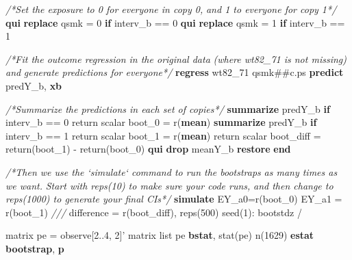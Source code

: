 \documentclass[
  10pt,
]{book}
\newenvironment{Shaded}{\begin{snugshade}}{\end{snugshade}}
\newcommand{\CommentTok}[1]{\textcolor[rgb]{0.56,0.35,0.01}{\textit{#1}}}
\newcommand{\DecValTok}[1]{\textcolor[rgb]{0.00,0.00,0.81}{#1}}
\newcommand{\FunctionTok}[1]{\textcolor[rgb]{0.00,0.00,0.00}{#1}}
\newcommand{\KeywordTok}[1]{\textcolor[rgb]{0.13,0.29,0.53}{\textbf{#1}}}
\newcommand{\NormalTok}[1]{#1}
\newcommand{\OtherTok}[1]{\textcolor[rgb]{0.56,0.35,0.01}{#1}}
\begin{document}
\begin{Shaded}
\begin{Highlighting}[]
\CommentTok{/*Set the exposure to 0 for everyone in copy 0, }
\CommentTok{and 1 to everyone for copy 1*/}
\KeywordTok{qui} \KeywordTok{replace}\NormalTok{ qsmk = 0 }\KeywordTok{if}\NormalTok{ interv_b == 0}
\KeywordTok{qui} \KeywordTok{replace}\NormalTok{ qsmk = 1 }\KeywordTok{if}\NormalTok{ interv_b == 1}

\CommentTok{/*Fit the outcome regression in the original data }
\CommentTok{(where wt82_71 is not missing) and }
\CommentTok{generate predictions for everyone*/}
\KeywordTok{regress}\NormalTok{ wt82_71 qsmk##c.ps}
\KeywordTok{predict}\NormalTok{ predY_b, }\KeywordTok{xb}

\CommentTok{/*Summarize the predictions in each set of copies*/}
\KeywordTok{summarize}\NormalTok{ predY_b }\KeywordTok{if}\NormalTok{ interv_b == 0}
\FunctionTok{return} \FunctionTok{scalar}\NormalTok{ boot_0 = }\FunctionTok{r}\NormalTok{(}\KeywordTok{mean}\NormalTok{)}
\KeywordTok{summarize}\NormalTok{ predY_b }\KeywordTok{if}\NormalTok{ interv_b == 1}
\FunctionTok{return} \FunctionTok{scalar}\NormalTok{ boot_1 = }\FunctionTok{r}\NormalTok{(}\KeywordTok{mean}\NormalTok{)}
\FunctionTok{return} \FunctionTok{scalar}\NormalTok{ boot_diff = }\FunctionTok{return}\NormalTok{(boot_1) - }\FunctionTok{return}\NormalTok{(boot_0)}
\KeywordTok{qui} \KeywordTok{drop}\NormalTok{ meanY_b}
\KeywordTok{restore}
\KeywordTok{end}

\CommentTok{/*Then we use the `simulate` command to run the bootstraps }
\CommentTok{as many times as we want.}
\CommentTok{Start with reps(10) to make sure your code runs, }
\CommentTok{and then change to reps(1000) to generate your final CIs*/}
\KeywordTok{simulate}\NormalTok{ EY_a0=}\FunctionTok{r}\NormalTok{(boot_0) EY_a1 = }\FunctionTok{r}\NormalTok{(boot_1) }\CommentTok{///}
\NormalTok{  difference = }\FunctionTok{r}\NormalTok{(boot_diff), reps(500) }\DecValTok{seed}\NormalTok{(1): bootstdz /}

\FunctionTok{matrix}\NormalTok{ pe = observe[2..4, 2]'}
\FunctionTok{matrix} \OtherTok{list}\NormalTok{ pe}
\KeywordTok{bstat}\NormalTok{, stat(pe) n(1629) }
\KeywordTok{estat} \KeywordTok{bootstrap}\NormalTok{, }\KeywordTok{p}
\end{Highlighting}
\end{Shaded}
\end{document}
